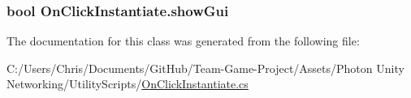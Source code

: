 \subsubsection[{\texorpdfstring{show\+Gui}{showGui}}]{\setlength{\rightskip}{0pt plus 5cm}bool On\+Click\+Instantiate.\+show\+Gui}\hypertarget{class_on_click_instantiate_ae42e02f90b1f85076f4c085521951fdf}{}\label{class_on_click_instantiate_ae42e02f90b1f85076f4c085521951fdf}


The documentation for this class was generated from the following file\+:\begin{DoxyCompactItemize}
\item 
C\+:/\+Users/\+Chris/\+Documents/\+Git\+Hub/\+Team-\/\+Game-\/\+Project/\+Assets/\+Photon Unity Networking/\+Utility\+Scripts/\hyperlink{_on_click_instantiate_8cs}{On\+Click\+Instantiate.\+cs}\end{DoxyCompactItemize}
